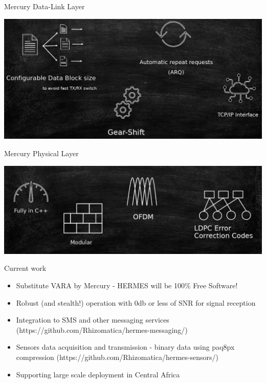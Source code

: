 \documentclass[aspectratio=169,xcolor={x11names,svgnames,dvipsnames}]{beamer}
\begin{document}
\begin{frame}{Mercury Data-Link Layer}

  \begin{center}
    \includegraphics[width=.95\columnwidth]{mercury2.jpg}
  \end{center}

\end{frame}

\begin{frame}{Mercury Physical Layer}

  \begin{center}
    \includegraphics[width=.95\columnwidth]{mercury3.jpg}
  \end{center}

\end{frame}


\begin{frame}{Current work}

  \begin{itemize}
  \item Substitute VARA by Mercury - HERMES will be 100\% Free Software!
  \item Robust (and stealth!) operation with 0db or less of SNR for signal reception
  \item Integration to SMS and other messaging services (https://github.com/Rhizomatica/hermes-messaging/)
  \item Sensors data acquisition and transmission - binary data using paq8px compression (https://github.com/Rhizomatica/hermes-sensors/)
  \item Supporting large scale deployment in Central Africa
  \end{itemize}
\end{frame}
\end{document}
